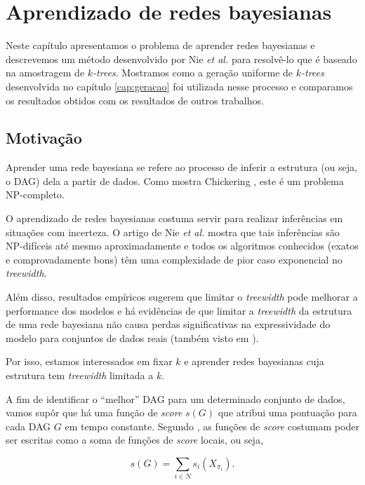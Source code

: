 \chapter{Aprendizado de redes bayesianas}
\label{cap:aprendizado}

Neste capítulo apresentamos o problema de aprender redes bayesianas e descrevemos um método desenvolvido por Nie \emph{et al.} \cite{maua} para resolvê-lo que é baseado na amostragem de \emph{$k$-trees}. Mostramos como a geração uniforme de \emph{$k$-trees} desenvolvida no capítulo \ref{cap:geracao} foi utilizada nesse processo e comparamos os resultados obtidos com os resultados de outros trabalhos.

\section{Motivação}

Aprender uma rede bayesiana se refere ao processo de inferir a estrutura (ou seja, o DAG) dela a partir de dados. Como mostra Chickering \cite{chickering}, este é um problema NP-completo.

O aprendizado de redes bayesianas costuma servir para realizar inferências em situações com incerteza. O artigo de Nie \emph{et al.} \cite{maua} mostra que tais inferências são NP-difíceis até mesmo aproximadamente e todos os algoritmos conhecidos (exatos e comprovadamente bons) têm uma complexidade de pior caso exponencial no \emph{treewidth}.

Além disso, resultados empíricos sugerem que limitar o \emph{treewidth} pode melhorar a performance dos modelos e há evidências de que limitar a \emph{treewidth} da estrutura de uma rede bayesiana não causa perdas significativas na expressividade do modelo para conjuntos de dados reais (também visto em \cite{maua}).

Por isso, estamos interessados em fixar $k$ e aprender redes bayesianas cuja estrutura tem \emph{treewidth} limitada a $k$.

\vspace{2em}

A fim de identificar o ``melhor'' DAG para um determinado conjunto de dados, vamos supôr que há uma função de \emph{score} $s(G)$ que atribui uma pontuação para cada DAG $G$ em tempo constante. Segundo \cite{nie}, as funções de \emph{score} costumam poder ser escritas como a soma de funções de \emph{score} locais, ou seja,

$$s(G) = \sum_{i \in N} s_i(X_{\pi_i}).$$

